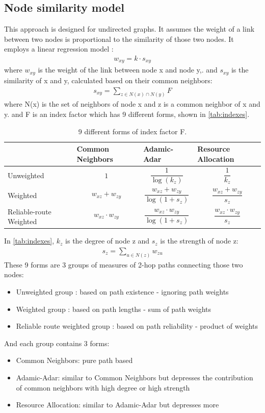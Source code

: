 \documentclass[conference]{IEEEtran}
\begin{document}
\subsection{Node similarity model}
This approach is designed for undirected graphs.
It assumes the weight of a link between two nodes 
is proportional to the similarity of those two nodes.
It employs a linear regression model \cite{zhao2015prediction}:
\begin{align*}
	w_{xy} = k \cdot s_{xy}
\end{align*}
where $ w_{xy} $ is the weight of the link between node x and node y,.
and $ s_{xy} $ is the similarity of x and y, calculated based on their common neighbors:
\begin{align*}
	s_{xy} = \sum_{z \in N(x) \cap N(y)} F
\end{align*}
where N(x) is the set of neighbors of node x and z is a common neighbor of x and y.
and F is an index factor which has 9 different forms, shown in \autoref{tab:indexes}.
\begin{table}[!htb]\centering
	\caption{9 different forms of index factor F.}
	\begin{tabularx}{0.45\textwidth}{|>{\columncolor{blue!40}}X|X|X|X|}  \hline \rowcolor{blue!40}
		& Common Neighbors & Adamic-Adar & Resource Allocation \\ \hline
		Unweighted &
		\[1\] &
		\[\frac{1}{\log(k_z)}\] &
		\[\frac{1}{k_z}\] \\ \hline
		Weighted &
		\[w_{xz} + w_{zy}\] &
		\[\frac{w_{xz} + w_{zy}}{\log(1 + s_z)}\] &
		\[\frac{w_{xz} + w_{zy}}{s_z}\] \\ \hline
		Reliable-route Weighted &
		\[ w_{xz} \cdot w_{zy}\] &
		\[\frac{w_{xz} \cdot w_{zy}}{\log(1 + s_z)}\] &
		\[\frac{w_{xz} \cdot w_{zy}}{s_z}\] \\ \hline
	\end{tabularx}
	\label{tab:indexes}
\end{table}
In \autoref{tab:indexes}, $ k_z $ is the degree of node z and $ s_z $ is the strength of node z:
\begin{align*}
s_z = \sum_{u \in N(z)} w_{zu}
\end{align*}
These 9 forms are 3 groups of measures of 2-hop paths connecting those two nodes:
\begin{itemize}
	\item Unweighted group \cite{adamic2003friends}: based on path existence - ignoring path weights
	\item Weighted group \cite{murata2007link}: based on path lengths - sum of path weights
	\item Reliable route weighted group \cite{taha1982operations}: based on path reliability - product of weights
\end{itemize}
And each group contains 3 forms:
\begin{itemize}
	\item Common Neighbors: pure path based
	\item Adamic-Adar: similar to Common Neighbors
	but depresses the contribution of common neighbors with high degree or high strength
	\item Resource Allocation: similar to Adamic-Adar but depresses more
\end{itemize}
\end{document}
